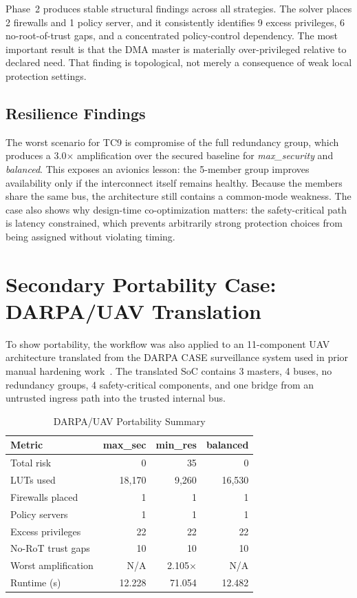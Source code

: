 \documentclass[conference]{IEEEtran}
\begin{document}
Phase~2 produces stable structural findings across all strategies. The solver
places 2 firewalls and 1 policy server, and it consistently identifies 9
excess privileges, 6 no-root-of-trust gaps, and a concentrated policy-control
dependency. The most important result is that the DMA master is materially
over-privileged relative to declared need. That finding is topological, not
merely a consequence of weak local protection settings.

\subsection{Resilience Findings}

The worst scenario for TC9 is compromise of the full redundancy group, which
produces a 3.0$\times$ amplification over the secured baseline for
\textit{max\_security} and \textit{balanced}. This exposes an avionics lesson:
the 5-member group improves availability only if the interconnect itself
remains healthy. Because the members share the same bus, the architecture
still contains a common-mode weakness. The case also shows why design-time
co-optimization matters: the safety-critical path is latency constrained,
which prevents arbitrarily strong protection choices from being assigned
without violating timing.

\section{Secondary Portability Case: DARPA/UAV Translation}

To show portability, the workflow was also applied to an 11-component UAV
architecture translated from the DARPA CASE surveillance system used in prior
manual hardening work~\cite{hasan_saecps,hasan_jsys,darpa_case}. The
translated SoC contains 3 masters, 4 buses, no redundancy groups, 4
safety-critical components, and one bridge from an untrusted ingress path
into the trusted internal bus.

\begin{table}[t]
\caption{DARPA/UAV Portability Summary}
\label{tab:uav}
\centering
\scriptsize
\begin{tabular}{lrrr}
\toprule
Metric & max\_sec & min\_res & balanced \\
\midrule
Total risk         & 0      & 35     & 0 \\
LUTs used          & 18,170 & 9,260  & 16,530 \\
Firewalls placed   & 1      & 1      & 1 \\
Policy servers     & 1      & 1      & 1 \\
Excess privileges  & 22     & 22     & 22 \\
No-RoT trust gaps  & 10     & 10     & 10 \\
Worst amplification& N/A    & 2.105$\times$ & N/A \\
Runtime (s)        & 12.228 & 71.054 & 12.482 \\
\bottomrule
\end{tabular}
\end{table}
\end{document}

